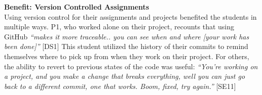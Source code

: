 





\textbf{Benefit: Version Controlled Assignments} \\


Using version control for their assignments and projects benefited the students in multiple ways. P1, who worked alone on their project, recounts that using GitHub \textit{``makes it more traceable.. you can see when and where [your work has been done]''} [DS1] This student utilized the history of their commits to remind themselves where to pick up from when they work on their project. For others, the ability to revert to previous states of the code was useful: \textit{``You're working on a project, and you make a change that breaks everything, well you can just go back to a different commit, one that works. Boom, fixed, try again.''} [SE11]

